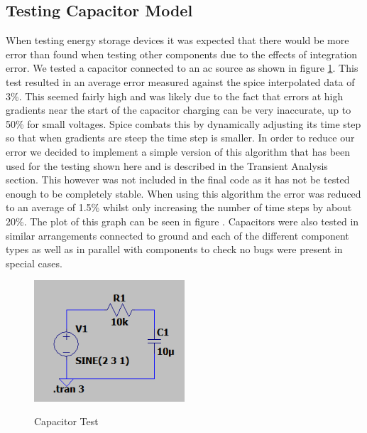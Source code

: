 \documentclass{article}
\begin{document}
\subsection{Testing Capacitor Model}
When testing energy storage devices it was expected that there would be more error than found when testing other components due to the effects of integration error. We tested a capacitor connected to an ac source as shown in figure \ref{fig:CapacitorTest1}. This test resulted in an average error measured against the spice interpolated data of 3\%. This seemed fairly high and was likely due to the fact that errors at high gradients near the start of the capacitor charging can be very inaccurate, up to 50\% for small voltages. Spice combats this by dynamically adjusting its time step so that when gradients are steep the time step is smaller. In order to reduce our error we decided to implement a simple version of this algorithm that has been used for the testing shown here and is described in the Transient Analysis section. This however was not included in the final code as it has not be tested enough to be completely stable. When using this algorithm the error was reduced to an average of 1.5\% whilst only increasing the number of time steps by about 20\%. The plot of this graph can be seen in figure . Capacitors were also tested in similar arrangements connected to ground and each of the different component types as well as in parallel with components to check no bugs were present in special cases. 
\begin{figure}[h]
    \caption{Capacitor Test}
    \centering
    \includegraphics[width=0.5\textwidth]{images/CapacitorTest1.png}
    \label{fig:CapacitorTest1}
\end{figure}
\end{document}

